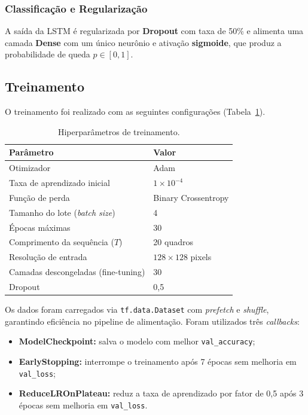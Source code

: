 \documentclass[12pt,a4paper]{article}
\begin{document}
\subsubsection{Classificação e Regularização}

A saída da LSTM é regularizada por \textbf{Dropout} com taxa de 50\% e alimenta uma camada \textbf{Dense} com um único neurônio e ativação \textbf{sigmoide}, que produz a probabilidade de queda $p \in [0,1]$.

\subsection{Treinamento}

O treinamento foi realizado com as seguintes configurações (Tabela~\ref{tab:hiperparametros}).

\begin{table}[H]
\centering
\caption{Hiperparâmetros de treinamento.}
\label{tab:hiperparametros}
\begin{tabular}{ll}
\toprule
\textbf{Parâmetro} & \textbf{Valor} \\
\midrule
Otimizador & Adam \\
Taxa de aprendizado inicial & $1 \times 10^{-4}$ \\
Função de perda & Binary Crossentropy \\
Tamanho do lote (\textit{batch size}) & 4 \\
Épocas máximas & 30 \\
Comprimento da sequência ($T$) & 20 quadros \\
Resolução de entrada & $128 \times 128$ pixels \\
Camadas descongeladas (fine-tuning) & 30 \\
Dropout & 0,5 \\
\bottomrule
\end{tabular}
\end{table}

Os dados foram carregados via \texttt{tf.data.Dataset} com \textit{prefetch} e \textit{shuffle}, garantindo eficiência no pipeline de alimentação. Foram utilizados três \textit{callbacks}:

\begin{itemize}[nosep]
  \item \textbf{ModelCheckpoint:} salva o modelo com melhor \texttt{val\_accuracy};
  \item \textbf{EarlyStopping:} interrompe o treinamento após 7 épocas sem melhoria em \texttt{val\_loss};
  \item \textbf{ReduceLROnPlateau:} reduz a taxa de aprendizado por fator de 0,5 após 3 épocas sem melhoria em \texttt{val\_loss}.
\end{itemize}
\end{document}
